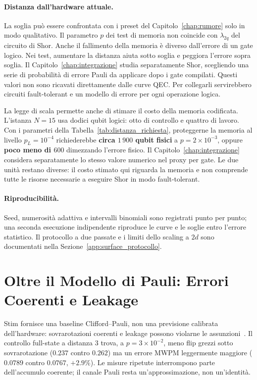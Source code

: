 \begin{onehalfspace}
\paragraph{Distanza dall'hardware attuale.}
La soglia può essere confrontata con i preset del Capitolo~\ref{chap:rumore} solo in modo qualitativo. Il parametro $p$ dei test di memoria non coincide con $\lambda_{2q}$ del circuito di Shor. Anche il fallimento della memoria è diverso dall'errore di un gate logico. Nei test, aumentare la distanza aiuta sotto soglia e peggiora l'errore sopra soglia. Il Capitolo~\ref{chap:integrazione} studia separatamente Shor, scegliendo una serie di probabilità di errore Pauli da applicare dopo i gate compilati. Questi valori non sono ricavati direttamente dalle curve QEC. Per collegarli servirebbero circuiti fault-tolerant e un modello di errore per ogni operazione logica.

La legge di scala permette anche di stimare il costo della memoria codificata. L'istanza $N=15$ usa dodici qubit logici: otto di controllo e quattro di lavoro. Con i parametri della Tabella~\ref{tab:distanza_richiesta}, proteggerne la memoria al livello $p_L = 10^{-4}$ richiederebbe \textbf{circa $1\,900$ qubit fisici} a $p = 2\times10^{-3}$, oppure \textbf{poco meno di $600$} dimezzando l'errore fisico. Il Capitolo~\ref{chap:integrazione} considera separatamente lo stesso valore numerico nel proxy per gate. Le due unità restano diverse: il costo stimato qui riguarda la memoria e non comprende tutte le risorse necessarie a eseguire Shor in modo fault-tolerant.

\paragraph{Riproducibilità.}
Seed, numerosità adattiva e intervalli binomiali sono registrati punto per
punto; una seconda esecuzione indipendente riproduce le curve e le soglie
entro l'errore statistico. Il protocollo a due passate e i limiti dello
scaling a $2d$ sono documentati nella
Sezione~\ref{app:surface_protocollo}.

\section{Oltre il Modello di Pauli: Errori Coerenti e Leakage}
\label{sec:oltre_pauli}

Stim fornisce una baseline Clifford--Pauli, non una previsione calibrata
dell'hardware: sovrarotazioni coerenti e leakage possono violarne le
assunzioni~\cite{plaquette2026}. Il controllo full-state a distanza 3
trova, a $p=3\times10^{-2}$, meno flip grezzi sotto sovrarotazione
($0.237$ contro $0.262$) ma un errore MWPM leggermente maggiore
($0.0789$ contro $0.0767$, $+2.9\%$). Le misure ripetute interrompono
parte dell'accumulo coerente; il canale Pauli resta un'approssimazione,
non un'identità.


\end{onehalfspace}
